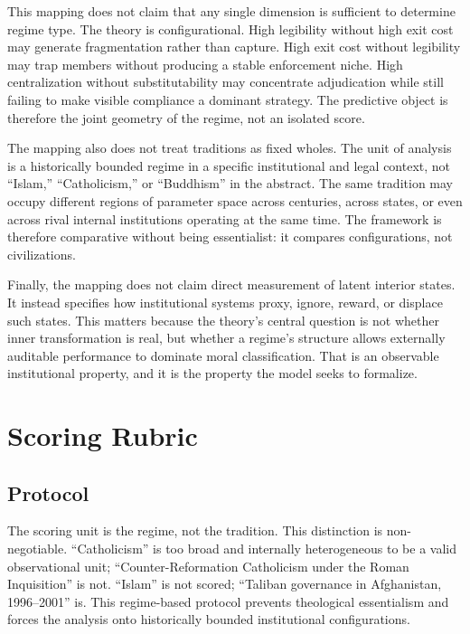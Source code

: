 \documentclass[12pt]{article}
\begin{document}
This mapping does not claim that any single dimension is sufficient to determine regime type. The theory is configurational. High legibility without high exit cost may generate fragmentation rather than capture. High exit cost without legibility may trap members without producing a stable enforcement niche. High centralization without substitutability may concentrate adjudication while still failing to make visible compliance a dominant strategy. The predictive object is therefore the joint geometry of the regime, not an isolated score.

The mapping also does not treat traditions as fixed wholes. The unit of analysis is a historically bounded regime in a specific institutional and legal context, not ``Islam,'' ``Catholicism,'' or ``Buddhism'' in the abstract. The same tradition may occupy different regions of parameter space across centuries, across states, or even across rival internal institutions operating at the same time. The framework is therefore comparative without being essentialist: it compares configurations, not civilizations.

Finally, the mapping does not claim direct measurement of latent interior states. It instead specifies how institutional systems proxy, ignore, reward, or displace such states. This matters because the theory's central question is not whether inner transformation is real, but whether a regime's structure allows externally auditable performance to dominate moral classification. That is an observable institutional property, and it is the property the model seeks to formalize.



\section{Scoring Rubric}

\subsection{Protocol}

The scoring unit is the regime, not the tradition. This distinction is non-negotiable. ``Catholicism'' is too broad and internally heterogeneous to be a valid observational unit; ``Counter-Reformation Catholicism under the Roman Inquisition'' is not. ``Islam'' is not scored; ``Taliban governance in Afghanistan, 1996--2001'' is. This regime-based protocol prevents theological essentialism and forces the analysis onto historically bounded institutional configurations.
\end{document}
